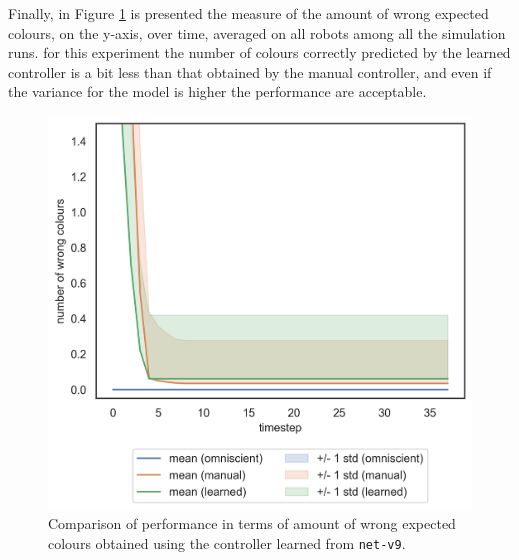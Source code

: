 Finally, in Figure \ref{fig:net-v9error} is presented the measure of the amount of 
wrong expected colours, on the y-axis, over time, averaged on all robots among 
all the simulation runs. 
for this experiment the number of colours correctly predicted by the learned 
controller is a bit less than that obtained by the manual controller, and even if the 
variance for the model is higher the performance are acceptable.
\begin{figure}[!htb]
	\centering
	\includegraphics[width=.5\textwidth]{contents/images/net-v9/colours-errors-compressed}%
	\caption[Evaluation of \texttt{net-v9} amount of wrong expected 
	colours.]{Comparison of performance in terms of amount of wrong expected 
		colours obtained using the controller learned from \texttt{net-v9}.}
	\label{fig:net-v9error}
\end{figure}

